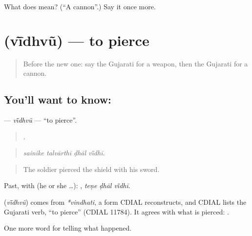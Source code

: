 \begin{tcolorbox}[breakable,colback=teal!4,colframe=teal!35!black,title={Before you move on}]
What does  mean? (\textquotedblleft{}A cannon\textquotedblright{}.) Say it once more.
\end{tcolorbox}
\section[\texorpdfstring{\gu{વીંધવું} (vī̃dhvũ)}{વીંધવું (vī̃dhvũ)}]{ (vī̃dhvũ) — to pierce}

\label{lesson:GU-C321-vidhvu}



\begin{quote}
Before the new one: say the Gujarati for a weapon, then the Gujarati for a cannon.
\end{quote}

\subsection*{You'll want to know: }
\textbf{} — \emph{vī̃dhvũ} — \textquotedblleft{}to pierce\textquotedblright{}.

\begin{quote}
   .
\end{quote}

\begin{quote}
\emph{sainike talvārthī ḍhāl vī̃dhī.}
\end{quote}

\begin{quote}
The soldier pierced the shield with his sword.
\end{quote}

Past, with  (he or she …):   , \emph{teṇe ḍhāl vī̃dhī}.

\begin{cousinweb}
\textbf{} (\emph{vī̃dhvũ}) comes from \emph{*vindhati}, a form CDIAL reconstructs, and CDIAL lists the Gujarati verb, \textquotedblleft{}to pierce\textquotedblright{} (CDIAL 11784). It agrees with what is pierced: \textbf{ }.
\end{cousinweb}

\begin{grammarlens}[title={What you've built}]
One more word for telling what happened.
\end{grammarlens}


